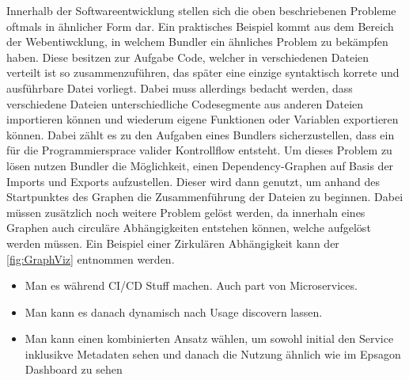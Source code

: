 \documentclass[
	12pt,
	BCOR=5mm,
	DIV=12,
	headinclude=on,
	footinclude=off,
	parskip=half,
	bibliography=totoc,
	listof=entryprefix,
	toc=listof,
	numbers=noenddot,
	plainfootsepline
]{scrreprt}
\begin{document}
Innerhalb der Softwareentwicklung stellen sich die oben beschriebenen Probleme oftmals in ähnlicher Form dar. Ein praktisches Beispiel kommt aus dem Bereich der Webentiwcklung, in welchem Bundler ein ähnliches Problem zu bekämpfen haben. Diese besitzen zur Aufgabe Code, welcher in verschiedenen Dateien verteilt ist so zusammenzuführen, das später eine einzige syntaktisch korrete und ausführbare Datei vorliegt. Dabei muss allerdings bedacht werden, dass verschiedene Dateien unterschiedliche Codesegmente aus anderen Dateien importieren können und wiederum eigene Funktionen oder Variablen exportieren können. Dabei zählt es zu den Aufgaben eines Bundlers sicherzustellen, dass ein für die Programmiersprace valider Kontrollflow entsteht. Um dieses Problem zu lösen nutzen Bundler die Möglichkeit, einen Dependency-Graphen auf Basis der Imports und Exports aufzustellen. Dieser wird dann genutzt, um anhand des Startpunktes des Graphen die Zusammenführung der Dateien zu beginnen. Dabei müssen zusätzlich noch weitere Problem gelöst werden, da innerhaln eines Graphen auch circuläre Abhängigkeiten entstehen können, welche aufgelöst werden müssen. Ein Beispiel einer Zirkulären Abhängigkeit kann der \autoref{fig:GraphViz} entnommen werden.

\begin{itemize}
	\item Man es während CI/CD Stuff machen. Auch part von Microservices.
	\item Man kann es danach dynamisch nach Usage discovern lassen.
	\item Man kann einen kombinierten Ansatz wählen, um sowohl initial den Service inklusikve Metadaten sehen und danach die Nutzung ähnlich wie im Epsagon Dashboard zu sehen
\end{itemize}
\end{document}
